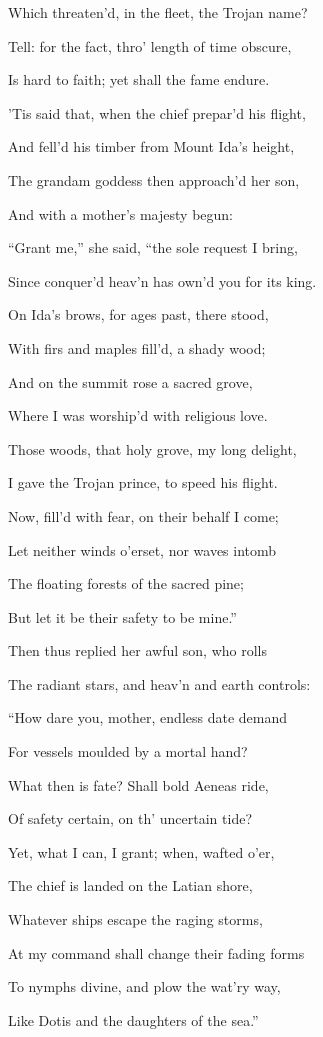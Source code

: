 Which threaten’d, in the fleet, the Trojan name?

Tell: for the fact, thro’ length of time obscure,

Is hard to faith; yet shall the fame endure.

’Tis said that, when the chief prepar’d his flight,

And fell’d his timber from Mount Ida’s height,

The grandam goddess then approach’d her son,

And with a mother’s majesty begun:

“Grant me,” she said, “the sole request I bring,

Since conquer’d heav’n has own’d you for its king.

On Ida’s brows, for ages past, there stood,

With firs and maples fill’d, a shady wood;

And on the summit rose a sacred grove,

Where I was worship’d with religious love.

Those woods, that holy grove, my long delight,

I gave the Trojan prince, to speed his flight.

Now, fill’d with fear, on their behalf I come;

Let neither winds o’erset, nor waves intomb

The floating forests of the sacred pine;

But let it be their safety to be mine.”

Then thus replied her awful son, who rolls

The radiant stars, and heav’n and earth controls:

“How dare you, mother, endless date demand

For vessels moulded by a mortal hand?

What then is fate? Shall bold Aeneas ride,

Of safety certain, on th’ uncertain tide?

Yet, what I can, I grant; when, wafted o’er,

The chief is landed on the Latian shore,

Whatever ships escape the raging storms,

At my command shall change their fading forms

To nymphs divine, and plow the wat’ry way,

Like Dotis and the daughters of the sea.”


